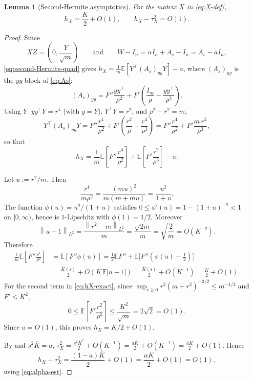 \documentclass[11pt]{article}
\theoremstyle{plain}
\newtheorem{lemma}[theorem]{Lemma}
\theoremstyle{definition}
\theoremstyle{remark}
\newcommand{\E}{\mathbb{E}}
\newcommand{\Id}{I}
\newcommand{\1}{\mathbf{1}}
\newcommand{\norm}[1]{\left\lVert #1\right\rVert}
\newcommand{\abs}[1]{\left\lvert #1\right\rvert}
\begin{document}
\begin{lemma}[Second-Hermite asymptotics]
\label{lem:hX}
For the matrix $X$ in \eqref{eq:X-def},
\begin{equation}
    h_X
    =
    \frac K2+O(1),
    \qquad
    h_X-\tau_X^2
    =
    O(1).
    \label{eq:hX-est}
\end{equation}
\end{lemma}

\begin{proof}
Since
\[
    XZ=\left(0,\frac{Y}{\sqrt m}\right)
    \qquad\text{and}\qquad
    W-\Id_n
    =
    \alpha\Id_n+A_s-\Id_n
    =
    A_s-a\Id_n,
\]
\eqref{eq:second-Hermite-quad} gives
$h_X=\frac1m\E[Y^\top(A_s)_{yy}Y]-a$, where $(A_s)_{yy}$ is the $yy$ block of
\eqref{eq:As}:
\[
    (A_s)_{yy}=F''\frac{yy^\top}{\rho^2}
    +F'\left(\frac{\Id_m}{\rho}-\frac{yy^\top}{\rho^3}\right).
\]
Using $Y^\top yy^\top Y=r^4$ (with $y=Y$), $Y^\top Y=r^2$, and
$\rho^2-r^2=m$,
\[
    Y^\top(A_s)_{yy}Y
    =F''\frac{r^4}{\rho^2}
    +F'\left(\frac{r^2}{\rho}-\frac{r^4}{\rho^3}\right)
    =F''\frac{r^4}{\rho^2}+F'\frac{m\,r^2}{\rho^3},
\]
so that
\begin{equation}
    h_X
    =
    \frac1m
    \E\!\left[
        F''\frac{r^4}{\rho^2}
    \right]
    +
    \E\!\left[
        F'\frac{r^2}{\rho^3}
    \right]
    -
    a.
    \label{eq:hX-exact}
\end{equation}

Let $u:=r^2/m$. Then
\[
    \frac{r^4}{m\rho^2}
    =
    \frac{(mu)^2}{m(m+mu)}
    =
    \frac{u^2}{1+u}.
\]
The function $\phi(u)=u^2/(1+u)$ satisfies $0\le\phi'(u)=1-(1+u)^{-2}<1$ on
$[0,\infty)$, hence is $1$-Lipschitz with $\phi(1)=1/2$. Moreover
\[
    \norm{u-1}_{L^2}
    =
    \frac{\norm{r^2-m}_{L^2}}{m}
    =
    \frac{\sqrt{2m}}{m}
    =
    \sqrt{\frac2m}
    =
    O(K^{-2}).
\]
Therefore
\begin{align*}
    \frac1m
    \E\!\left[
        F''\frac{r^4}{\rho^2}
    \right]
    &=
    \E[F''\phi(u)]
    =
    \frac12\E F''
    +
    \E\bigl[F''(\phi(u)-\tfrac12)\bigr]\\
    &=
    \frac{\overline K(s)}2
    +
    O\!\left(K\,\E\abs{u-1}\right)
    =
    \frac{\overline K(s)}2+O(K^{-1})
    =
    \frac K2+O(1).
\end{align*}
For the second term in \eqref{eq:hX-exact}, since
$\sup_{r\geq0}r^2(m+r^2)^{-3/2}\leq m^{-1/2}$ and $F'\leq K^2$,
\[
    0
    \leq
    \E\!\left[
        F'\frac{r^2}{\rho^3}
    \right]
    \leq
    \frac{K^2}{\sqrt m}
    =
    2\sqrt2
    =
    O(1).
\]
Since $a=O(1)$, this proves $h_X=K/2+O(1)$.

By  and $s^2\overline K=a$,
$\tau_X^2=\frac{s^2\overline K^2}2+O(K^{-1})=\frac{a\overline K}2+O(K^{-1})
=\frac{aK}2+O(1)$. Hence
\[
    h_X-\tau_X^2
    =
    \frac{(1-a)\overline K}{2}+O(1)
    =
    \frac{\alpha K}{2}+O(1)
    =
    O(1),
\]
using \eqref{eq:alpha-est}.
\end{proof}
\end{document}
